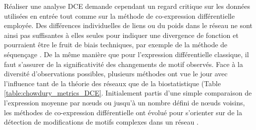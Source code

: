 Réaliser une analyse DCE demande cependant un regard critique sur les données utilisées en entrée tout comme sur la méthode de co-expression différentielle employée. Des différences individuelles de liens ou du poids dans le réseau ne sont ainsi pas suffisantes à elles seules pour indiquer une divergence de fonction et pourraient être le fruit de biais techniques, par exemple de la méthode de séquençage \cite{Southworth2009}. De la même manière que pour l'expression différentielle classique, il faut s'assurer de la significativité des changements de motif observés. Face à la diversité d'observations possibles, plusieurs méthodes ont vue le jour avec l'influence tant de la théorie des réseaux que de la biostatistique (Table \ref{table:chowdury_metrics_DCE}. Initialement partis d'une simple comparaison de l'expression moyenne par nœuds ou jusqu'à un nombre défini de nœuds voisins, les méthodes de co-expression différentielle ont évolué pour s'orienter sur de la détection de modifications de motifs complexes dans un réseau \cite{delaFuente2010Jul}. 

